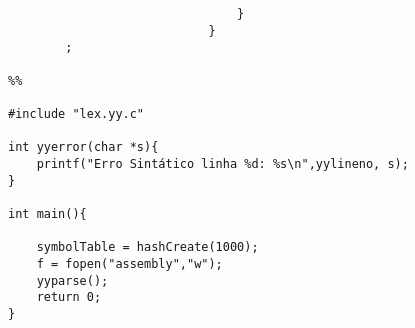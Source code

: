 \documentclass{report}
\begin{document}
\begin{verbatim}
                                }
                            }
        ;

%%

#include "lex.yy.c"

int yyerror(char *s){
    printf("Erro Sintático linha %d: %s\n",yylineno, s);
}
     
int main(){

    symbolTable = hashCreate(1000);
    f = fopen("assembly","w");
    yyparse(); 
    return 0; 
}

\end{verbatim}
\end{document}
